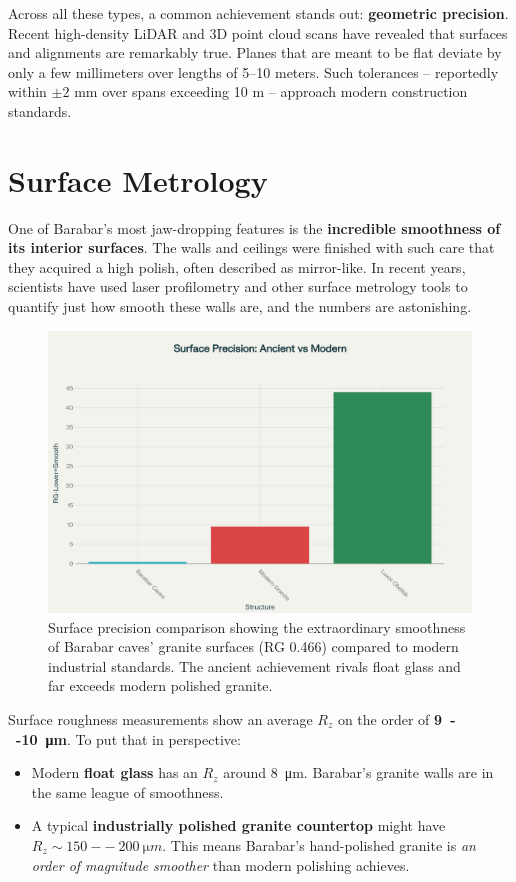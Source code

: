 \documentclass[11pt]{article}
\begin{document}
Across all these types, a common achievement stands out: \textbf{geometric precision}. Recent high-density LiDAR and 3D point cloud scans have revealed that surfaces and alignments are remarkably true. Planes that are meant to be flat deviate by only a few millimeters over lengths of 5--10 meters. Such tolerances -- reportedly within $\pm 2$ mm over spans exceeding 10 m -- approach modern construction standards.

\section{Surface Metrology}

One of Barabar's most jaw-dropping features is the \textbf{incredible smoothness of its interior surfaces}. The walls and ceilings were finished with such care that they acquired a high polish, often described as mirror-like. In recent years, scientists have used laser profilometry and other surface metrology tools to quantify just how smooth these walls are, and the numbers are astonishing.

\begin{figure}[H]
\centering
\includegraphics[width=0.8\linewidth]{.github/surface_precision_comparison.png}
\caption{Surface precision comparison showing the extraordinary smoothness of Barabar caves' granite surfaces (RG 0.466) compared to modern industrial standards. The ancient achievement rivals float glass and far exceeds modern polished granite.}
\label{fig:surface_precision}
\end{figure}

Surface roughness measurements show an average $R_z$ on the order of \textbf{\SI{9}{--}\SI{10}{\micro m}}. To put that in perspective:

\begin{itemize}
\item Modern \textbf{float glass} has an $R_z$ around \SI{8}{\micro m}. Barabar's granite walls are in the same league of smoothness.
\item A typical \textbf{industrially polished granite countertop} might have $R_z \sim \SI{150}{--}\SI{200}{\micro m}$. This means Barabar's hand-polished granite is \textit{an order of magnitude smoother} than modern polishing achieves.
\end{itemize}
\end{document}
